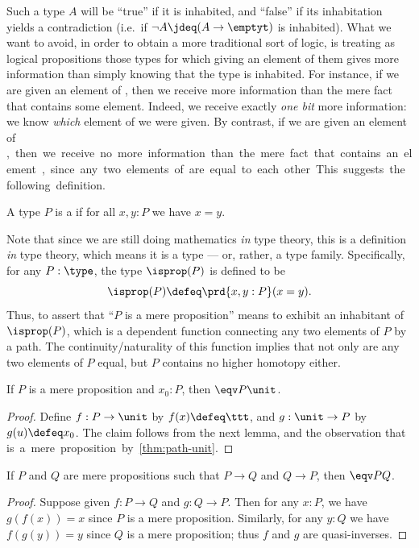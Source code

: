 Such a type $A$ will be ``true'' if it is inhabited, and ``false'' if its inhabitation yields a contradiction (i.e.\ if $\neg A \jdeq (A\to\emptyt)$ is inhabited).
%
What we want to avoid, in order to obtain a more traditional sort of logic, is treating as logical propositions those types for which giving an element of them gives more information than simply knowing that the type is inhabited.
For instance, if we are given an element of \bool, then we receive more information than the mere fact that \bool contains some element.
Indeed, we receive exactly \emph{one bit}
%
more information: we know \emph{which} element of \bool we were given.
By contrast, if we are given an element of \unit, then we receive no more information than the mere fact that \unit contains an element, since any two elements of \unit are equal to each other.
This suggests the following definition.

\begin{defn}\label{defn:isprop}
  A type $P$ is a 
  if for all $x,y:P$ we have $x=y$.
\end{defn}

Note that since we are still doing mathematics \emph{in} type theory, this is a definition \emph{in} type theory, which means it is a type --- or, rather, a type family.
Specifically, for any $P:\type$, the type $\isprop(P)$ is defined to be
\[ \isprop(P) \defeq \prd{x,y:P} (x=y). \]
Thus, to assert that ``$P$ is a mere proposition'' means to exhibit an inhabitant of $\isprop(P)$, which is a dependent function connecting any two elements of $P$ by a path.
The continuity/naturality of this function implies that not only are any two elements of $P$ equal, but $P$ contains no higher homotopy either.

\begin{lem}\label{thm:inhabprop-eqvunit}
  If $P$ is a mere proposition and $x_0:P$, then $\eqv P \unit$.
\end{lem}
\begin{proof}
  Define $f:P\to\unit$ by $f(x)\defeq \ttt$, and $g:\unit\to P$ by $g(u)\defeq x_0$.
  The claim follows from the next lemma, and the observation that \unit is a mere proposition by \cref{thm:path-unit}.
\end{proof}

\begin{lem}\label{lem:equiv-iff-hprop}
  If $P$ and $Q$ are mere propositions such that $P\to Q$ and $Q\to P$, then $\eqv P Q$.
\end{lem}
\begin{proof}
  Suppose given $f:P\to Q$ and $g:Q\to P$.
  Then for any $x:P$, we have $g(f(x))=x$ since $P$ is a mere proposition.
  Similarly, for any $y:Q$ we have $f(g(y))=y$ since $Q$ is a mere proposition; thus $f$ and $g$ are quasi-inverses.
\end{proof}


